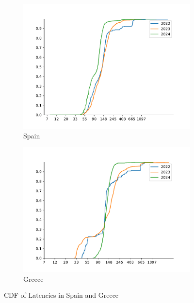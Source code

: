\begin{figure}
	\centering
	\begin{subfigure}[b]{0.8\linewidth}
		\includegraphics[width=\linewidth]{chapters/4-results/latency/img/cdf_latencies_of_starlink_probes_in_spain.pdf}
		\caption{Spain}
	\end{subfigure}
	\begin{subfigure}[b]{0.8\linewidth}
		\includegraphics[width=\linewidth]{chapters/4-results/latency/img/cdf_latencies_of_starlink_probes_in_greece.pdf}
		\caption{Greece}
	\end{subfigure}
	\caption{CDF of Latencies in Spain and Greece}
	\label{fig:latency-cdf-4}
\end{figure}

